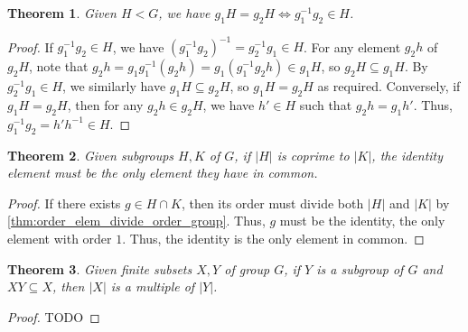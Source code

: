 \documentclass{article}
\newtheorem{theorem}{Theorem}[section]
\begin{document}
\begin{theorem}
    Given $H < G$, we have $g_{1}H = g_{2}H \iff g_{1}^{-1}g_{2} \in H$.
\end{theorem}
\begin{proof}
    If $g_{1}^{-1}g_{2} \in H$, we have $(g_{1}^{-1}g_{2})^{-1} = g_{2}^{-1}g_{1} \in H$.
    For any element $g_{2}h$ of $g_{2}H$, note that
    $g_{2}h = g_{1}g_{1}^{-1}(g_{2}h) = g_{1}(g_{1}^{-1}g_{2}h) \in g_{1}H$,
    so $g_{2}H \subseteq g_{1}H$.
    By $g_{2}^{-1}g_{1} \in H$, we similarly have $g_{1}H \subseteq g_{2}H$, so $g_{1}H = g_{2}H$ as required.
    Conversely, if $g_{1}H = g_{2}H$, then
    for any $g_{2}h \in g_{2}H$, we have $h' \in H$ such that $g_{2}h = g_{1}h'$.
    Thus, $g_{1}^{-1}g_{2} = h'h^{-1} \in H$.
\end{proof}

\begin{theorem}
    Given subgroups $H,K$ of $G$, if $|H|$ is coprime to $|K|$,
    the identity element must be the only element they have in common.
\end{theorem}
\begin{proof}
    If there exists $g \in H \cap K$, 
    then its order must divide both $|H|$ and $|K|$ by \autoref{thm:order_elem_divide_order_group}.
    Thus, $g$ must be the identity, the only element with order $1$.
    Thus, the identity is the only element in common.
\end{proof}

\begin{theorem}
    Given finite subsets $X,Y$ of group $G$, if 
    $Y$ is a subgroup of $G$ and $XY \subseteq X$,
    then $|X|$ is a multiple of $|Y|$.
\end{theorem}
\begin{proof}
    TODO
\end{proof}
\end{document}
